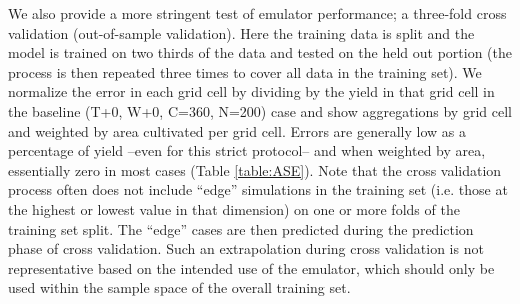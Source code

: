 \documentclass[gmd, manuscript]{copernicus} %
\begin{document}
We also provide a more stringent test of emulator performance; a three-fold cross validation (out-of-sample validation). 
Here the training data is split and the model is trained on two thirds of the data and tested on the held out portion (the process is then repeated three times to cover all data in the training set). 
We normalize the error in each grid cell by dividing by the yield in that grid cell in the baseline (T+0, W+0, C=360, N=200) case and show aggregations by grid cell and weighted by area cultivated per grid cell. 
Errors are generally low as a percentage of yield --even for this strict protocol-- and when weighted by area, essentially zero in most cases (Table \ref{table:ASE}). 
Note that the cross validation process often does not include ``edge'' simulations in the training set (i.e. those at the highest or lowest value in that dimension) on one or more folds of the training set split.
The ``edge'' cases are then predicted during the prediction phase of cross validation.
Such an extrapolation during cross validation is not representative based on the intended use of the emulator, which should only be used within the sample space of the overall training set.

\end{document}
